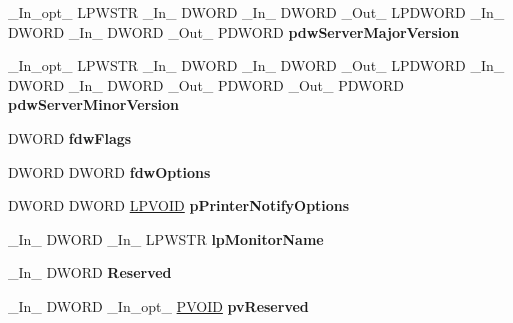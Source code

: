 \begin{DoxyCompactItemize}
\+\_\+\+In\+\_\+opt\+\_\+ L\+P\+W\+S\+TR \+\_\+\+In\+\_\+ D\+W\+O\+RD \+\_\+\+In\+\_\+ D\+W\+O\+RD \+\_\+\+Out\+\_\+ L\+P\+D\+W\+O\+RD \+\_\+\+In\+\_\+ D\+W\+O\+RD \+\_\+\+In\+\_\+ D\+W\+O\+RD \+\_\+\+Out\+\_\+ P\+D\+W\+O\+RD {\bfseries pdw\+Server\+Major\+Version}
\item 
\mbox{\label{struct___p_r_i_n_t_p_r_o_v_i_d_o_r_a474c447f80f00f7b4cd9ddef25676844}} 
\+\_\+\+In\+\_\+opt\+\_\+ L\+P\+W\+S\+TR \+\_\+\+In\+\_\+ D\+W\+O\+RD \+\_\+\+In\+\_\+ D\+W\+O\+RD \+\_\+\+Out\+\_\+ L\+P\+D\+W\+O\+RD \+\_\+\+In\+\_\+ D\+W\+O\+RD \+\_\+\+In\+\_\+ D\+W\+O\+RD \+\_\+\+Out\+\_\+ P\+D\+W\+O\+RD \+\_\+\+Out\+\_\+ P\+D\+W\+O\+RD {\bfseries pdw\+Server\+Minor\+Version}
\item 
\mbox{\label{struct___p_r_i_n_t_p_r_o_v_i_d_o_r_a2856c37940e5f533ea74e610411d0c4f}} 
D\+W\+O\+RD {\bfseries fdw\+Flags}
\item 
\mbox{\label{struct___p_r_i_n_t_p_r_o_v_i_d_o_r_ab5f581102785e425df8d7aded323fdb2}} 
D\+W\+O\+RD D\+W\+O\+RD {\bfseries fdw\+Options}
\item 
\mbox{\label{struct___p_r_i_n_t_p_r_o_v_i_d_o_r_af3b2fe6df3e2ed2de5eafc117842f4c2}} 
D\+W\+O\+RD D\+W\+O\+RD \hyperlink{interfacevoid}{L\+P\+V\+O\+ID} {\bfseries p\+Printer\+Notify\+Options}
\item 
\mbox{\label{struct___p_r_i_n_t_p_r_o_v_i_d_o_r_aafb318cb1a7a521adb67fdce4c8a373a}} 
\+\_\+\+In\+\_\+ D\+W\+O\+RD \+\_\+\+In\+\_\+ L\+P\+W\+S\+TR {\bfseries lp\+Monitor\+Name}
\item 
\mbox{\label{struct___p_r_i_n_t_p_r_o_v_i_d_o_r_a94841d76f05b8e07d0405354a5a47298}} 
\+\_\+\+In\+\_\+ D\+W\+O\+RD {\bfseries Reserved}
\item 
\mbox{\label{struct___p_r_i_n_t_p_r_o_v_i_d_o_r_a9e2e87aad110cc6ab664f56d592e8d0d}} 
\+\_\+\+In\+\_\+ D\+W\+O\+RD \+\_\+\+In\+\_\+opt\+\_\+ \hyperlink{interfacevoid}{P\+V\+O\+ID} {\bfseries pv\+Reserved}
\item 
\mbox{\label{struct___p_r_i_n_t_p_r_o_v_i_d_o_r_a5cea635bc12a70e02e346d0c2e2a63a3}} 

\end{DoxyCompactItemize}
